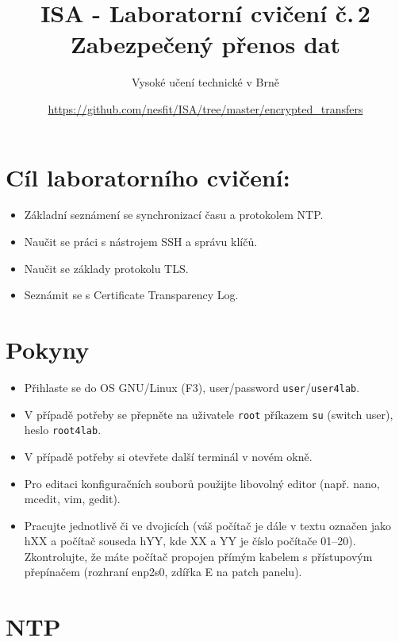 \documentclass[a4paper,11pt]{article}
\title{ISA - Laboratorní cvičení č.\,2\\
{\bf\large Zabezpečený přenos dat}}
\author{Vysoké učení technické v Brně}
\date{\url{https://github.com/nesfit/ISA/tree/master/encrypted_transfers}}
\begin{document}
{\let\newpage\relax\maketitle}

\section*{Cíl laboratorního cvičení:}
\begin{itemize}
  \item Základní seznámení se synchronizací času a protokolem NTP.
  \item Naučit se práci s nástrojem SSH a správu klíčů.
  \item Naučit se základy protokolu TLS.
  \item Seznámit se s Certificate Transparency Log.
\end{itemize}

\section*{Pokyny}
\begin{itemize}
  \item Přihlaste se do OS GNU/Linux (F3), user/password {\tt user}/{\tt user4lab}.
  \item V případě potřeby se přepněte na uživatele {\tt root} příkazem {\tt su}
  (switch user), heslo {\tt root4lab}.
  \item V případě potřeby si otevřete další terminál v novém okně.
  \item Pro editaci konfiguračních souborů použijte libovolný editor (např.
  nano, mcedit, vim, gedit).
\item Pracujte jednotlivě či ve dvojicích (váš počítač je dále v textu označen jako hXX a
  počítač souseda hYY, kde XX a YY je číslo počítače 01--20). Zkontrolujte, že máte počítač propojen
    přímým kabelem s přístupovým přepínačem (rozhraní enp2s0, zdířka E na patch
    panelu).
  
\end{itemize}

\section{NTP}
\end{document}
